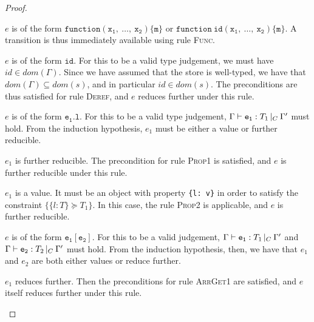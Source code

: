 \documentclass[a4paper]{article}
\theoremstyle{definition}
\theoremstyle{dotless}
\begin{document}
\begin{proof}
\begin{case}[V\_Arr]
  \end{case}

  \begin{case}\label{fun}

	$e$ is of the form $\mathtt{function(x_1,\ \dots,\ x_2)\{m\}}$ or
	$\mathtt{function\ id(x_1,\ \dots,\ x_2)\{m\}}$. A transition is thus
	immediately available using rule \textsc{Func}.

  \end{case}

  \begin{case}[IDType]\label{idtype}

	$e$ is of the form $\mathtt{id}$. For this to be a valid type judgement, we
	must have $id \in dom(\Gamma)$. Since we have assumed that the store is
	well-typed, we have that $dom(\Gamma) \subseteq dom(s)$, and in particular
	$id \in dom(s)$.  The preconditions are thus satisfied for rule
	\textsc{Deref}, and $e$ reduces further under this rule.

  \end{case}

  \begin{case}[PropType]\label{proptype}

	$e$ is of the form $\mathtt{e_1.l}$. For this to be a valid type
	judgement, $\Gamma{}\vdash\mathtt{e_1}: T_1\,|_C\:\Gamma'$ must hold. From the induction
	hypothesis, $e_1$ must be either a value or further reducible.
	\begin{subcase}
	  $e_1$ is further reducible.
	  The precondition for rule \textsc{Prop1} is
	  satisfied, and $e$ is further reducible under this rule.
  	\end{subcase}
  	\begin{subcase}
  	  $e_1$ is a value.
  	  It must be an object with property \texttt{\{l: v\}}
	  in order to satisfy the constraint $\{\{l:T\}\succeq T_1\}$. In this case, the rule
	  \textsc{Prop2} is applicable, and $e$ is further reducible.
  	\end{subcase}
  \end{case}

  \begin{case}[ArrayType]\label{arraytype}

	$e$ is of the form $\mathtt{e_1[e_2]}$. For this to be a valid
	judgement, $\Gamma{}\vdash\mathtt{e_1}: T_1\,|_C\:\Gamma'$ and $\Gamma{}\vdash\mathtt{e_2}: T_2\,|_C\:\Gamma'$ must hold. From
	the induction hypothesis, then, we have that $e_1$ and $e_2$ are both
	either values or reduce further.

	\begin{subcase}
	  $e_1$ reduces further.
	  Then the preconditions for rule
	  \textsc{ArrGet1} are satisfied, and $e$ itself reduces further under
	  this rule.
	\end{subcase}


\end{case}
\end{proof}
\end{document}
